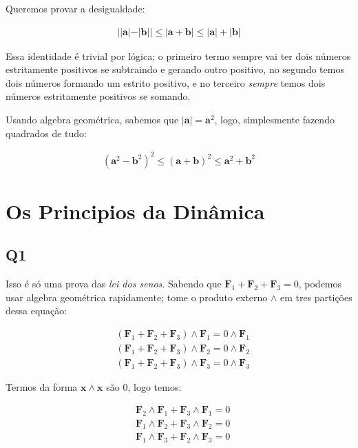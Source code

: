 \documentclass{antiquebook}
\begin{document}
	Queremos provar a desigualdade:

	\begin{align*}
		| |\mathbf{a}| - |\mathbf{b}|| \le
		| \mathbf{a}+\mathbf{b} | \le
		| \mathbf{a} | + | \mathbf{b} |
	\end{align*}

	Essa identidade é trivial por lógica; o primeiro termo sempre vai ter dois números
	estritamente positivos se subtraindo e gerando outro positivo, no segundo temos dois números
	formando um estrito positivo, e no terceiro \emph{sempre} temos dois números estritamente
	positivos se somando.

	\vspace{\baselineskip}

	Usando algebra geométrica, sabemos que
	$|\mathbf{a}| = \mathbf{a}^2$, logo, simplesmente
	fazendo quadrados de tudo:

	\begin{align*}
		(\mathbf{a}^2-\mathbf{b}^2)^2 \le (\mathbf{a}+\mathbf{b})^2 \le
		\mathbf{a}^2 + \mathbf{b}^2
	\end{align*}

	\chapter{Os Principios da Dinâmica}

	\section{Q1}

	Isso é só uma prova das \emph{lei dos senos}. Sabendo que $\mathbf{F}_1+\mathbf{F}_2+\mathbf{F}_3=0$,
	podemos usar algebra geométrica rapidamente; tome o produto externo $\wedge$ em tres partições
	dessa equação:

	\begin{align*}
		&(\mathbf{F}_1+\mathbf{F}_2+\mathbf{F}_3)\wedge\mathbf{F}_1=0\wedge \mathbf{F}_1 \\
		&(\mathbf{F}_1+\mathbf{F}_2+\mathbf{F}_3)\wedge\mathbf{F}_2=0\wedge \mathbf{F}_2 \\
		&(\mathbf{F}_1+\mathbf{F}_2+\mathbf{F}_3)\wedge\mathbf{F}_3=0\wedge \mathbf{F}_3 
	\end{align*}

	Termos da forma $\mathbf{x} \wedge \mathbf{x}$ são $0$, logo temos:

	\begin{align*}
		&\mathbf{F}_2\wedge\mathbf{F}_1+\mathbf{F}_3\wedge\mathbf{F}_1 =0 \\
		&\mathbf{F}_1\wedge\mathbf{F}_2+\mathbf{F}_3\wedge\mathbf{F}_2 =0  \\
		&\mathbf{F}_1\wedge\mathbf{F}_3+\mathbf{F}_2\wedge\mathbf{F}_3 =0  
	\end{align*}
\end{document}

